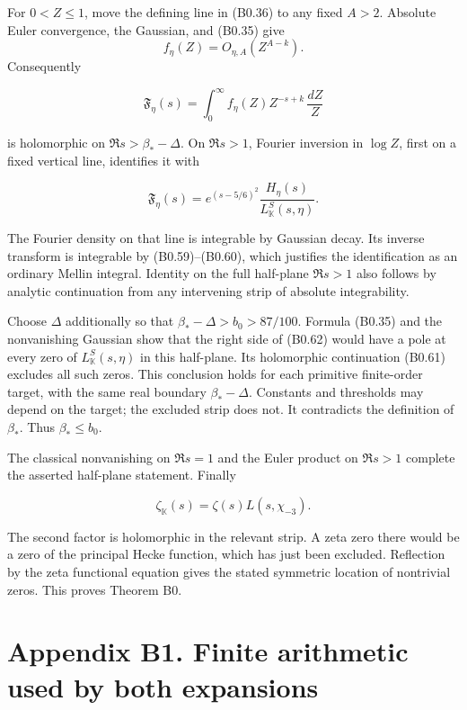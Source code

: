 \documentclass[11pt,a4paper]{article}
\begin{document}
For \(0<Z\le1\), move the defining line in (B0.36) to any fixed \(A>2\).
Absolute Euler convergence, the Gaussian, and (B0.35) give \[
f_\eta(Z)=O_{\eta,A}(Z^{A-k}).
\tag{B0.60}
\] Consequently

\[
\mathfrak F_\eta(s)=\int_0^\infty f_\eta(Z)Z^{-s+k}\,\frac{dZ}{Z}
\tag{B0.61}
\]

is holomorphic on \(\Re s>\beta_*-\Delta\). On \(\Re s>1\), Fourier
inversion in \(\log Z\), first on a fixed vertical line, identifies it
with

\[
\mathfrak F_\eta(s)=
e^{(s-5/6)^2}\frac{H_\eta(s)}{L_{\mathbb K}^S(s,\eta)}.
\tag{B0.62}
\]

The Fourier density on that line is integrable by Gaussian decay. Its
inverse transform is integrable by (B0.59)--(B0.60), which justifies the
identification as an ordinary Mellin integral. Identity on the full
half-plane \(\Re s>1\) also follows by analytic continuation from any
intervening strip of absolute integrability.

Choose \(\Delta\) additionally so that \(\beta_*-\Delta>b_0>87/100\).
Formula (B0.35) and the nonvanishing Gaussian show that the right side
of (B0.62) would have a pole at every zero of
\(L_{\mathbb K}^S(s,\allowbreak{}\eta)\) in this half-plane. Its holomorphic
continuation (B0.61) excludes all such zeros. This conclusion holds for
each primitive finite-order target, with the same real boundary
\(\beta_*-\Delta\). Constants and thresholds may depend on the target;
the excluded strip does not. It contradicts the definition of
\(\beta_*\). Thus \(\beta_*\le b_0\).

The classical nonvanishing on \(\Re s=1\) and the Euler product on
\(\Re s>1\) complete the asserted half-plane statement. Finally

\[
\zeta_{\mathbb K}(s)=\zeta(s)L(s,\chi_{-3}).
\tag{B0.63}
\]

The second factor is holomorphic in the relevant strip. A zeta zero
there would be a zero of the principal Hecke function, which has just
been excluded. Reflection by the zeta functional equation gives the
stated symmetric location of nontrivial zeros. This proves Theorem B0.

\hypertarget{appendix-b1.-finite-arithmetic-used-by-both-expansions}{%
\section{Appendix B1. Finite arithmetic used by both
expansions}\label{appendix-b1.-finite-arithmetic-used-by-both-expansions}}
\end{document}
